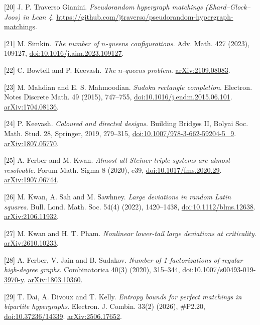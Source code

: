 \documentclass[english,11pt,a4paper]{article}
\begin{document}
{[}20{]} J. P. Traverso Gianini. \emph{Pseudorandom hypergraph matchings (Ehard--Glock--Joos) in Lean 4}. \url{https://github.com/jtraverso/pseudorandom-hypergraph-matchings}.

{[}21{]} M. Simkin. \emph{The number of \(n\)-queens configurations}. Adv. Math. 427 (2023), 109127, \href{https://doi.org/10.1016/j.aim.2023.109127}{doi:10.1016/j.aim.2023.109127}.

{[}22{]} C. Bowtell and P. Keevash. \emph{The \(n\)-queens problem}. \href{https://arxiv.org/abs/2109.08083}{arXiv:2109.08083}.

{[}23{]} M. Mahdian and E. S. Mahmoodian. \emph{Sudoku rectangle completion}. Electron. Notes Discrete Math. 49 (2015), 747--755, \href{https://doi.org/10.1016/j.endm.2015.06.101}{doi:10.1016/j.endm.2015.06.101}. \href{https://arxiv.org/abs/1704.08136}{arXiv:1704.08136}.

{[}24{]} P. Keevash. \emph{Coloured and directed designs}. Building Bridges II, Bolyai Soc. Math. Stud. 28, Springer, 2019, 279--315, \href{https://doi.org/10.1007/978-3-662-59204-5_9}{doi:10.1007/978-3-662-59204-5\_9}. \href{https://arxiv.org/abs/1807.05770}{arXiv:1807.05770}.

{[}25{]} A. Ferber and M. Kwan. \emph{Almost all Steiner triple systems are almost resolvable}. Forum Math. Sigma 8 (2020), e39, \href{https://doi.org/10.1017/fms.2020.29}{doi:10.1017/fms.2020.29}. \href{https://arxiv.org/abs/1907.06744}{arXiv:1907.06744}.

{[}26{]} M. Kwan, A. Sah and M. Sawhney. \emph{Large deviations in random Latin squares}. Bull. Lond. Math. Soc. 54(4) (2022), 1420--1438, \href{https://doi.org/10.1112/blms.12638}{doi:10.1112/blms.12638}. \href{https://arxiv.org/abs/2106.11932}{arXiv:2106.11932}.

{[}27{]} M. Kwan and H. T. Pham. \emph{Nonlinear lower-tail large deviations at criticality}. \href{https://arxiv.org/abs/2610.10233}{arXiv:2610.10233}.

{[}28{]} A. Ferber, V. Jain and B. Sudakov. \emph{Number of 1-factorizations of regular high-degree graphs}. Combinatorica 40(3) (2020), 315--344, \href{https://doi.org/10.1007/s00493-019-3970-y}{doi:10.1007/s00493-019-3970-y}. \href{https://arxiv.org/abs/1803.10360}{arXiv:1803.10360}.

{[}29{]} T. Dai, A. Divoux and T. Kelly. \emph{Entropy bounds for perfect matchings in bipartite hypergraphs}. Electron. J. Combin. 33(2) (2026), \#P2.20, \href{https://doi.org/10.37236/14339}{doi:10.37236/14339}. \href{https://arxiv.org/abs/2506.17652}{arXiv:2506.17652}.
\end{document}

